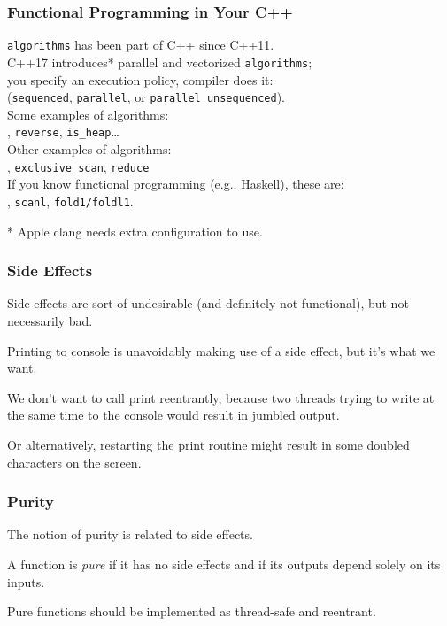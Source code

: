 \begin{frame}
\frametitle{Functional Programming in Your C++}

{\tt algorithms} has been part of C++ since C++11.\\

C++17 introduces* parallel and vectorized {\tt algorithms};\\
\qquad you specify an execution policy, compiler does it:\\
\qquad ({\tt sequenced}, {\tt parallel},
or {\tt parallel\_unsequenced}).\\[1em]

Some examples of algorithms:\\
, {\tt reverse}, {\tt is\_heap}\ldots\\[1em]

Other examples of algorithms:\\
, {\tt exclusive\_scan}, {\tt reduce}\\[1em]
If you know functional programming (e.g., Haskell), these are:\\
, {\tt scanl}, {\tt fold1/foldl1}.

* Apple clang needs extra configuration to use.

\end{frame}

\begin{frame}
\frametitle{Side Effects}

Side effects are sort of undesirable (and definitely not functional), but not necessarily bad. 

Printing to console is unavoidably making use of a side effect, but it's what we want. 

We don't want to call print reentrantly, because two threads trying to write at the same time to the console would result in jumbled output. 

Or alternatively, restarting the print routine might result in some doubled characters on the screen.

\end{frame}

\begin{frame}
\frametitle{Purity}

The notion of purity is related to side effects.

A function is \emph{pure} if it has no side effects and if its outputs depend solely on its inputs.

Pure functions should be implemented as thread-safe and reentrant.

\end{frame}

